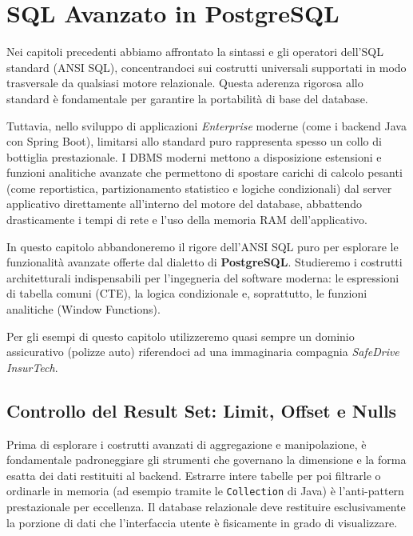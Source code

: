\chapter{SQL Avanzato in PostgreSQL}

Nei capitoli precedenti abbiamo affrontato la sintassi e gli operatori dell'SQL standard (ANSI SQL), concentrandoci sui costrutti universali supportati in modo trasversale da qualsiasi motore relazionale. Questa aderenza rigorosa allo standard è fondamentale per garantire la portabilità di base del database.

Tuttavia, nello sviluppo di applicazioni \textit{Enterprise} moderne (come i backend Java con Spring Boot), limitarsi allo standard puro rappresenta spesso un collo di bottiglia prestazionale. I DBMS moderni mettono a disposizione estensioni e funzioni analitiche avanzate che permettono di spostare carichi di calcolo pesanti (come reportistica, partizionamento statistico e logiche condizionali) dal server applicativo direttamente all'interno del motore del database, abbattendo drasticamente i tempi di rete e l'uso della memoria RAM dell'applicativo.

In questo capitolo abbandoneremo il rigore dell'ANSI SQL puro per esplorare le funzionalità avanzate offerte dal dialetto di \textbf{PostgreSQL}. Studieremo i costrutti architetturali indispensabili per l'ingegneria del software moderna: le espressioni di tabella comuni (CTE), la logica condizionale e, soprattutto, le funzioni analitiche (Window Functions).

\medskip

Per gli esempi di questo capitolo utilizzeremo quasi sempre un dominio assicurativo (polizze auto) riferendoci ad una immaginaria compagnia \textit{SafeDrive InsurTech}. 

\section{Controllo del Result Set: Limit, Offset e Nulls}

Prima di esplorare i costrutti avanzati di aggregazione e manipolazione, è fondamentale padroneggiare gli strumenti che governano la dimensione e la forma esatta dei dati restituiti al backend. Estrarre intere tabelle per poi filtrarle o ordinarle in memoria (ad esempio tramite le \texttt{Collection} di Java) è l'anti-pattern prestazionale per eccellenza. Il database relazionale deve restituire esclusivamente la porzione di dati che l'interfaccia utente è fisicamente in grado di visualizzare.

